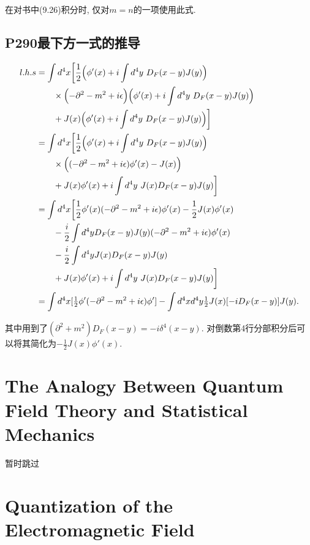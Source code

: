 \documentclass[10pt,b5paper,openany]{book}
\begin{document}
在对书中(9.26)积分时, 仅对$m=n$的一项使用此式. 

\subsection{P290最下方一式的推导}
\begin{equation}
  \begin{aligned}
    l.h.s &= \int d^4 x \biggl[\frac{1}{2}\Bigl(\phi'(x) + i\int d^4y\ D_F(x-y)J(y)\Bigr) \\ 
    &\qquad \times \Bigl(-\partial^2 - m^2 + i\epsilon\Bigr)\Bigl(\phi'(x) + i\int d^4y\ D_F(x-y)J(y)\Bigr) \\
    &\qquad + J(x)\Bigl(\phi'(x) + i\int d^4y\ D_F(x-y)J(y)\Bigr)\biggr] \\
    &= \int d^4 x \biggl[\frac{1}{2}\Bigl(\phi'(x) + i\int d^4y\ D_F(x-y)J(y)\Bigr) \\ 
    &\qquad \times \Bigl((-\partial^2 - m^2 + i\epsilon)\phi'(x) - J(x)\Bigr) \\
    &\qquad + J(x)\phi'(x) + i\int d^4y\ J(x)D_F(x-y)J(y)\biggr] \\
    &= \int d^4 x \biggl[\frac{1}{2}\phi'(x)(-\partial^2 - m^2 + i\epsilon)\phi'(x) - \frac{1}{2}J(x)\phi'(x) \\
    &\qquad - \frac{i}{2}\int d^4y D_F(x-y)J(y)(-\partial^2 - m^2 + i\epsilon)\phi'(x) \\ 
    &\qquad - \frac{i}{2}\int d^4y J(x)D_F(x-y)J(y) \\
    &\qquad + J(x)\phi'(x) + i\int d^4y\ J(x)D_F(x-y)J(y)\biggr] \\
    &= \int d^4x [\tfrac{1}{2}\phi'(-\partial^2 - m^2 + i\epsilon)\phi'] - \int d^4x d^4y \tfrac{1}{2}J(x)[-iD_F(x-y)]J(y). 
  \end{aligned}
\end{equation}

其中用到了$(\partial^2 + m^2)D_F(x-y) = -i\delta^4(x-y)$. 对倒数第4行分部积分后可以将其简化为$-\frac{1}{2}J(x)\phi'(x)$. 

\section{The Analogy Between Quantum Field Theory and Statistical Mechanics}

暂时跳过

\section{Quantization of the Electromagnetic Field}
\end{document}
